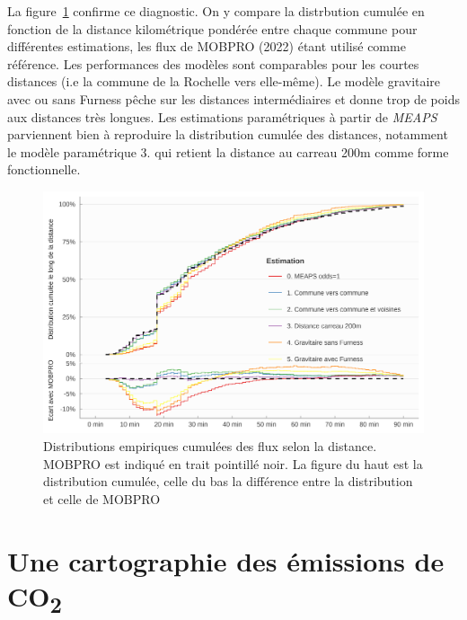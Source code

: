 \documentclass[
  10pt,
  a4paper,
  numbers=noendperiod,
  DIV=9]{scrartcl}
\begin{document}
La figure~\ref{fig-distrdist} confirme ce diagnostic. On y compare la
distrbution cumulée en fonction de la distance kilométrique pondérée
entre chaque commune pour différentes estimations, les flux de MOBPRO
(2022) étant utilisé comme référence. Les performances des modèles sont
comparables pour les courtes distances (i.e la commune de la Rochelle
vers elle-même). Le modèle gravitaire avec ou sans Furness pêche sur les
distances intermédiaires et donne trop de poids aux distances très
longues. Les estimations paramétriques à partir de \emph{MEAPS}
parviennent bien à reproduire la distribution cumulée des distances,
notamment le modèle paramétrique 3. qui retient la distance au carreau
200m comme forme fonctionnelle.

\begin{figure}[htb]

{\centering \includegraphics[width=1\textwidth,height=\textheight]{larochelle_files/figure-pdf/fig-distrdist-1.png}

}

\caption[Distributions empiriques cumulées des
distances]{\label{fig-distrdist}Distributions empiriques cumulées des
flux selon la distance. MOBPRO est indiqué en trait pointillé noir. La
figure du haut est la distribution cumulée, celle du bas la différence
entre la distribution et celle de MOBPRO}

\end{figure}

\hypertarget{une-cartographie-des-uxe9missions-de-co2}{%
\section{\texorpdfstring{Une cartographie des émissions de
CO\textsubscript{2}}{Une cartographie des émissions de CO2}}\label{une-cartographie-des-uxe9missions-de-co2}}
\end{document}
